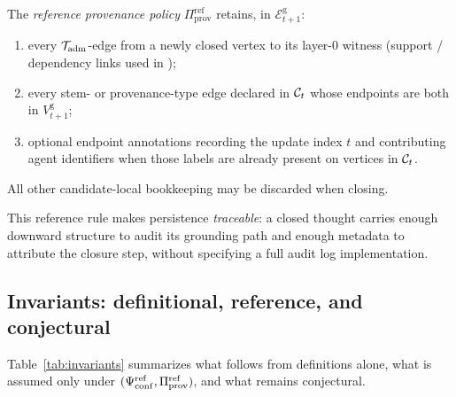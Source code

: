 \begin{definition}
\label{def:ref-provenance}
The \emph{reference provenance policy} $\Pi_{\mathrm{prov}}^{\mathrm{ref}}$ retains, in $\mathcal{E}^{\mathrm{g}}_{t+1}$:
\begin{enumerate}[label=(\roman*),leftmargin=*]
  \item every $\mathcal{T}_{\mathrm{adm}}$-edge from a newly closed vertex to its layer-$0$ witness (support / dependency links used in );
  \item every stem- or provenance-type edge declared in $\mathcal{C}_t$ whose endpoints are both in $V^{\mathrm{g}}_{t+1}$;
  \item optional endpoint annotations recording the update index $t$ and contributing agent identifiers when those labels are already present on vertices in $\mathcal{C}_t$.
\end{enumerate}
All other candidate-local bookkeeping may be discarded when closing.
\end{definition}

\begin{remark}
\label{rem:ref-prov-read}
This reference rule makes persistence \emph{traceable}: a closed thought carries enough downward structure to audit its grounding path and enough metadata to attribute the closure step, without specifying a full audit log implementation.
\end{remark}

\subsection{Invariants: definitional, reference, and conjectural}
\label{sec:invariants}

Table~\ref{tab:invariants} summarizes what follows from definitions alone, what is assumed only under $(\Psi_{\mathrm{conf}}^{\mathrm{ref}},\Pi_{\mathrm{prov}}^{\mathrm{ref}})$, and what remains conjectural.

